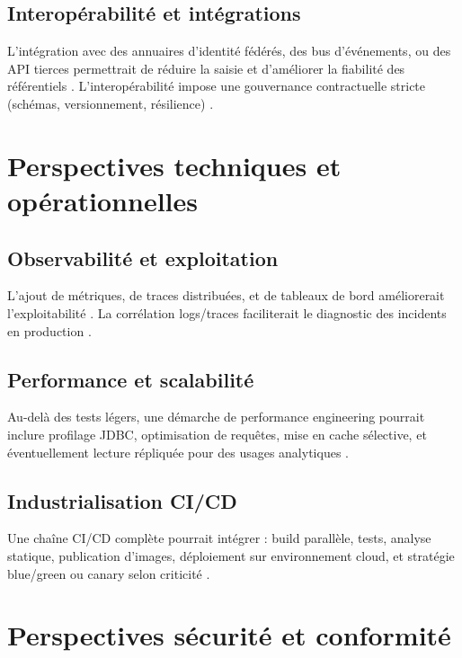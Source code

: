 \subsection{Interopérabilité et intégrations}

L'intégration avec des annuaires d'identité fédérés, des bus d'événements, ou des API tierces permettrait de réduire la saisie et d'améliorer la fiabilité des référentiels \cite{kleppmann2017,newman2021}. L'interopérabilité impose une gouvernance contractuelle stricte (schémas, versionnement, résilience) \cite{fielding2000}.

\section{Perspectives techniques et opérationnelles}

\subsection{Observabilité et exploitation}

L'ajout de métriques, de traces distribuées, et de tableaux de bord améliorerait l'exploitabilité \cite{bass2021}. La corrélation logs/traces faciliterait le diagnostic des incidents en production \cite{iso25010}.

\subsection{Performance et scalabilité}

Au-delà des tests légers, une démarche de performance engineering pourrait inclure profilage JDBC, optimisation de requêtes, mise en cache sélective, et éventuellement lecture répliquée pour des usages analytiques \cite{kleppmann2017,postgresdoc}.

\subsection{Industrialisation CI/CD}

Une chaîne CI/CD complète pourrait intégrer : build parallèle, tests, analyse statique, publication d'images, déploiement sur environnement cloud, et stratégie blue/green ou canary selon criticité \cite{dockerdoc,twelvefactor,sommerville2016}.

\section{Perspectives sécurité et conformité}

